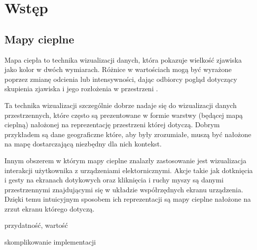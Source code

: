 \section{Wstęp}

\subsection{Mapy cieplne}
Mapa ciepła to technika wizualizacji danych, która pokazuje wielkość zjawiska jako kolor w dwóch wymiarach. Różnice w wartościach mogą być wyrażone poprzez zmianę odcienia lub intensywności, dając odbiorcy pogląd dotyczący skupienia zjawiska i jego rozłożenia w przestrzeni \cite{Heat_map_definition}.

Ta technika wizualizacji szczególnie dobrze nadaje się do wizualizacji danych przestrzennych, które często są prezentowane w formie warstwy (będącej mapą cieplną) nałożonej na reprezentację przestrzeni której dotyczą. Dobrym przykładem są dane geograficzne które, aby były zrozumiałe, muszą być nałożone na mapę dostarczającą niezbędny dla nich kontekst.


Innym obszerem w którym mapy cieplne znalazły zastosowanie jest wizualizacja interakcji użytkownika z urządzeniami elektornicznymi. Akcje takie jak dotknięcia i gesty na ekranach dotykowych oraz kliknięcia i ruchy myszy są danymi przestrzennymi znajdującymi się w układzie współrzędnych ekranu urządzenia. Dzięki temu intuicyjnym  sposobem ich reprezentacji są mapy cieplne nałożone na zrzut ekranu którego dotyczą.



przydatność, wartość

skomplikowanie implementacji

